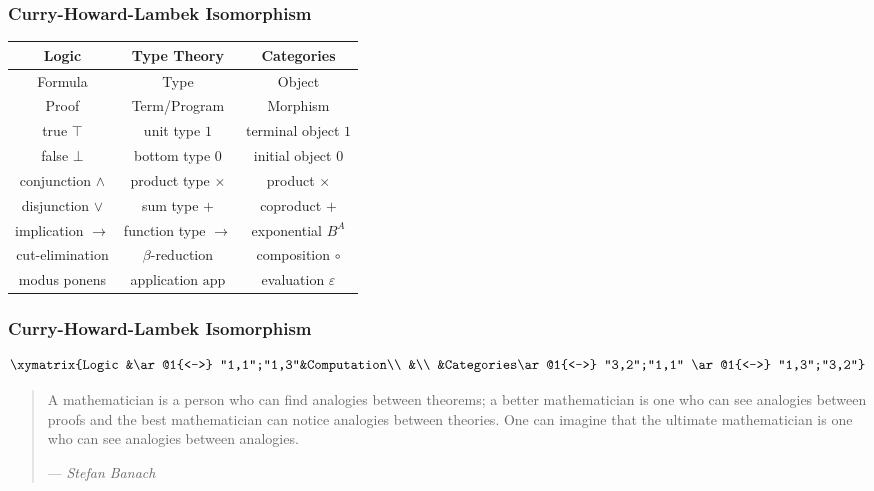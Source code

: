\documentclass[UTF8,aspectratio=43,11pt,colorlinks,compress,openany]{beamer}%
\begin{document}
\begin{frame}\frametitle{Curry-Howard-Lambek Isomorphism}
\begin{table}
\begin{tabu}{c|c|c}
\hline
\textbf{Logic}&\textbf{Type Theory}&\textbf{Categories}\\
\hline
Formula&Type&Object\\
Proof&Term/Program&Morphism\\
\hline
true $\top$&unit type $1$&terminal object $1$\\
false $\bot$&bottom type $0$&initial object $0$\\
conjunction $\wedge$&product type $\times$&product $\times$\\
disjunction $\vee$&sum type $+$&coproduct $+$\\
implication $\to$&function type $\to$&exponential $B^A$\\
cut-elimination&$\beta$-reduction&composition $\circ$\\
modus ponens&application $\mathrm{app}$&evaluation $\varepsilon$\\
\hline
\end{tabu}
\end{table}
\end{frame}

\begin{frame}\frametitle{Curry-Howard-Lambek Isomorphism}
\[\xymatrix{Logic &\ar@1{<->} "1,1";"1,3"&Computation\\
&\\
&Categories\ar@1{<->} "3,2";"1,1" \ar@1{<->} "1,3";"3,2"}\]
\begin{quote}
A mathematician is a person who can find analogies between theorems; a better mathematician is one who can see analogies between proofs and the best mathematician can notice analogies between theories. One can imagine that the ultimate mathematician is one who can see analogies between analogies.\par\hfill --- \textsl{Stefan Banach}
\end{quote}
\end{frame}
\end{document}
